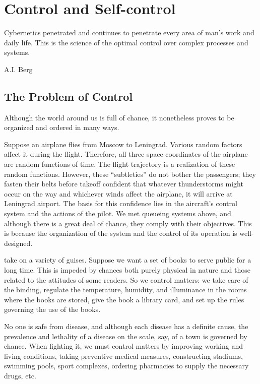 
\chapter{Control and Self-control}
\epigraph{Cybernetics penetrated and continues to penetrate every area of man's work and daily life. This is the science of the optimal control over complex processes and systems.}  {A.I. Berg}

\section{The Problem of Control}

 Although the world around us is full of
chance, it nonetheless proves to be organized and ordered in many
ways. 

Suppose an airplane flies from Moscow to Leningrad. Various
random factors affect it during the flight. Therefore, all three space
coordinates of the airplane are random functions of time. The flight
trajectory is a realization of these random functions. However, these
``subtleties'' do not bother the passengers; they fasten their belts before
takeoff confident that whatever thunderstorms might occur on the way
and whichever winds affect the airplane, it will arrive at Leningrad
airport. The basis for this confidence lies in the aircraft's control system
and the actions of the pilot. We met queueing systems above, and although
there is a great deal of chance, they comply with their objectives.
This is because the organization of the system and the control of
its operation is well-designed.

 take on a variety of guises. Suppose we want a set of books
to serve public for a long time. This is impeded by chances both purely
physical in nature and those related to the attitudes of some readers. So
we control matters: we take care of the binding, regulate the
temperature, humidity, and illuminance in the rooms where the books
are stored, give the book a library card, and set up the rules governing
the use of the books.

No one is safe from disease, and although each disease has a definite
cause, the prevalence and lethality of a disease on the scale, say, of
a town is governed by chance. When fighting it, we must control matters
by improving working and living conditions, taking preventive medical
measures, constructing stadiums, swimming pools, sport complexes,
ordering pharmacies to supply the necessary drugs, etc.

